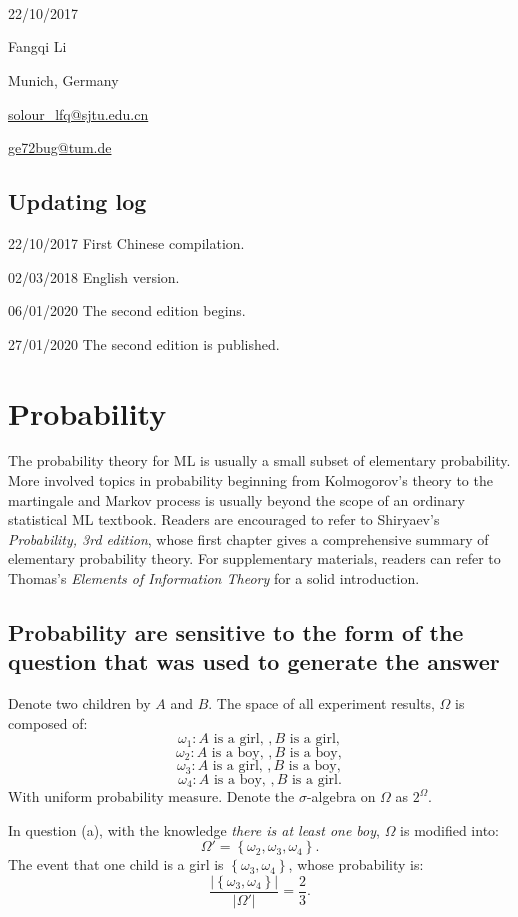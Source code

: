 \documentclass[UTF8]{ctexart}
\begin{document}
\

\

\

22/10/2017

Fangqi Li

Munich, Germany

\url{solour_lfq@sjtu.edu.cn}

\url{ge72bug@tum.de}

\newpage
\subsection{Updating log}
22/10/2017 First Chinese compilation.

02/03/2018 English version.

06/01/2020 The second edition begins.

27/01/2020 The second edition is published.

\newpage
\section{Probability}
The probability theory for ML is usually a small subset of elementary probability.
More involved topics in probability beginning from Kolmogorov's theory to the martingale and Markov process is usually beyond the scope of an ordinary statistical ML textbook.
Readers are encouraged to refer to Shiryaev's \emph{Probability, 3rd edition}, whose first chapter gives a comprehensive summary of elementary probability theory.
For supplementary materials, readers can refer to Thomas's \emph{Elements of Information Theory} for a solid introduction.

\subsection{Probability are sensitive to the form of the question that was used to generate the answer}
Denote two children by $A$ and $B$.
The space of all experiment results, $\Omega$ is composed of:
$$\omega_{1}:A\text{ is a girl, },B\text{ is a girl},$$
$$\omega_{2}:A\text{ is a boy, },B\text{ is a boy},$$
$$\omega_{3}:A\text{ is a girl, },B\text{ is a boy},$$
$$\omega_{4}:A\text{ is a boy, },B\text{ is a girl}.$$
With uniform probability measure.
Denote the $\sigma$-algebra on $\Omega$ as $2^{\Omega}$.

In question (a), with the knowledge \emph{there is at least one boy}, $\Omega$ is modified into:
$$\Omega'=\left\{\omega_{2},\omega_{3},\omega_{4} \right\}.$$
The event that one child is a girl is $\left\{\omega_{3},\omega_{4} \right\}$, whose probability is:
$$\frac{|\left\{\omega_{3},\omega_{4} \right\}|}{|\Omega'|}=\frac{2}{3}.$$
\end{document}
